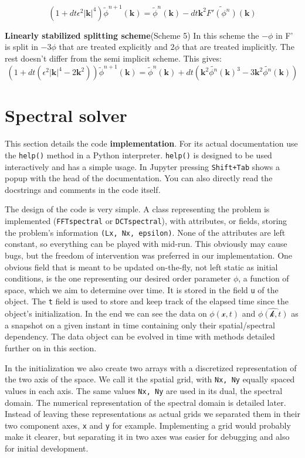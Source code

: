 \documentclass[a4paper]{article}
\begin{document}
$$(1+dt\epsilon^2|\textbf{k}|^4)\tilde{\phi}^{n+1}(\textbf{k})=\tilde{\phi}^n(\textbf{k})-dt\textbf{k}^2\tilde{F'(\phi^n)}(\textbf{k})$$

\textbf{Linearly stabilized splitting scheme}(Scheme 5)
In this scheme the $-\phi$ in F' is split in $-3\phi$ that are treated explicitly and $2\phi$ that are treated implicitly. The rest doesn't differ from the semi implicit scheme. This gives:
$$(1+dt(\epsilon^2|\textbf{k}|^4-2\textbf{k}^2))\tilde{\phi}^{n+1}(\textbf{k})=\tilde{\phi}^n(\textbf{k})+dt(\textbf{k}^2\tilde{{\phi^n}}(\textbf{k})^3-3\textbf{k}^2\tilde{\phi^n}(\textbf{k}))$$



\section{Spectral solver}
This section details the code {\bf implementation}.
For its actual documentation use the \verb`help()` method in a Python interpreter. 
\verb`help()` is designed to be used interactively and has a simple usage.
In Jupyter pressing \verb`Shift+Tab` shows a popup with the head of the documentation.
You can also directly read the docstrings and comments in the code itself.

The design of the code is very simple.
A class representing the problem is implemented (\verb`FFTspectral` or \verb`DCTspectral`),
with attributes, or fields, storing the problem's information \verb`(Lx, Nx, epsilon)`.
None of the attributes are left constant, so everything can be played with mid-run.
This obviously may cause bugs, but the freedom of intervention was preferred in our implementation.
One obvious field that is meant to be updated on-the-fly,
not left static as initial conditions,
is the one representing our desired order parameter $\phi$,
a function of space,
which we aim to determine over time.
It is stored in the field \verb`u` of the object.
The \verb`t` field is used to store and keep track of the elapsed time since the object's initialization.
In the end we can see the data on
$\phi(\mathcal{x}, t)$
and
$\hat{\phi(\mathcal{k}, t)}$
as a snapshot on a given instant in time containing only their spatial/spectral dependency.
The data object can be evolved in time with methods detailed further on in this section.

In the initialization we also create two arrays with a discretized representation of the two axis of the space.
We call it the spatial grid, with \verb`Nx, Ny` equally spaced values in each axis.
The same values \verb`Nx, Ny` are used in its dual, the spectral domain.
The numerical representation of the spectral domain is detailed later.
Instead of leaving these representations as actual grids we separated them in their two component axes, \verb`x` and \verb`y` for example.
Implementing a grid would probably make it clearer, but separating it in two axes was easier for debugging and also for initial development.
\end{document}
